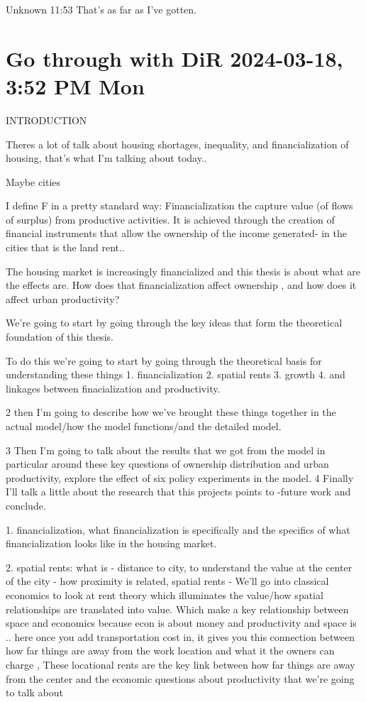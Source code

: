 Unknown 11:53
That's as far as I've gotten.




\section{Go through with DiR 2024-03-18, 3:52 PM Mon}

INTRODUCTION

Theres a lot of talk about housing shortages, inequality, and financialization of housing, that's what I'm talking about today..

Maybe cities

I define F in a pretty standard way: Financialization the capture value (of flows of surplus) from productive activities. It is achieved through the creation of financial instruments that allow the ownership of the income generated- in the cities that is the land rent.. 

The housing market is increasingly financialized and this thesis is about what are the effects are. How does that financialization affect ownership , and how does it affect urban productivity?

We’re going to start by going through the key ideas that form the theoretical foundation of this thesis.


To do this we’re going to start by going through the theoretical basis for understanding these things
1. financialization
2. spatial rents
3. growth
4. and linkages between finacialization and productivity.
 
 2 then I'm going to describe how we've brought these things together in the actual model/how the model functions/and the detailed model.
 
 3 Then I'm going to talk about the results that we got from the model in particular around these key questions of ownership distribution and urban productivity, explore the effect of six policy experiments in the model. 
 4 Finally I'll talk a little about the research that this projects points to -future work and conclude.



1. financialization, what financialization is  specifically  and  the specifics of what financialization looks like in the housing market.

2. spatial rents: what is - distance to city, to understand the value at the center of the city - how proximity is related, spatial rents - We'll go into classical economics to look at rent theory which illuminates the value/how spatial relationships are translated into value. Which make a key relationship between space and economics because econ is about money and productivity and space is .. here once you add transportation cost in, it gives you this connection between how far things are away from the work location and what it the owners can charge , These locational rents are the key link between how far things are away from the center and the economic questions about productivity  that we're going to talk about

